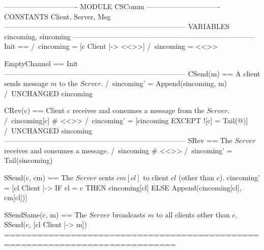 

\begin{tla}
------------------------------- MODULE CSComm -------------------------------
CONSTANTS Client, Server, Msg
-----------------------------------------------------------------------------
VARIABLES cincoming, sincoming
-----------------------------------------------------------------------------
Init == 
    /\ cincoming = [c \in Client |-> <<>>]
    /\ sincoming = <<>>

EmptyChannel == Init
-----------------------------------------------------------------------------
CSend(m) == \* A client sends message $m$ to the $Server$.
    /\ sincoming' = Append(sincoming, m)
    /\ UNCHANGED cincoming

CRev(c) == \* Client $c$ receives and consumes a message from the $Server$.                  
    /\ cincoming[c] # <<>>
    /\ cincoming' = [cincoming EXCEPT ![c] = Tail(@)]
    /\ UNCHANGED sincoming
-----------------------------------------------------------------------------
SRev == \* The $Server$ receives and consumes a message.      
    /\ sincoming # <<>>
    /\ sincoming' = Tail(sincoming)

SSend(c, cm) == \* The $Server$ sents $cm[cl]$ to client $cl$ (other than $c$).
    cincoming' = [cl \in Client |-> IF cl = c THEN cincoming[cl] 
                                    ELSE Append(cincoming[cl], cm[cl])]

SSendSame(c, m) == \* The $Server$ broadcasts $m$ to all clients other than $c$.
    SSend(c, [cl \in Client |-> m])
=============================================================================
\end{tla}

